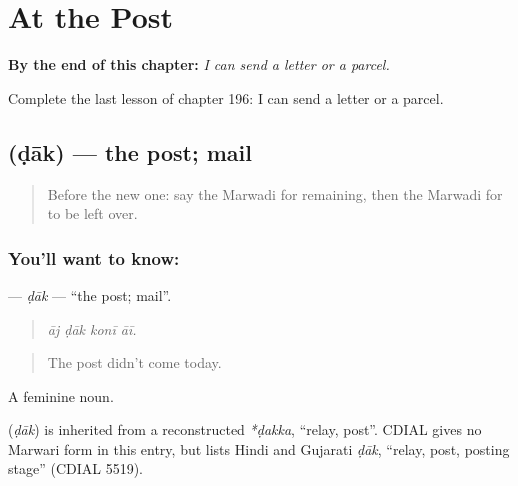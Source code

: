
\chapter{At the Post}
\label{ch:mw-at-the-post}

\begin{chapteropening}
\textbf{By the end of this chapter:} \emph{I can send a letter or a parcel.}

Complete the last lesson of chapter 196: I can send a letter or a parcel.
\end{chapteropening}

\section[\texorpdfstring{\mw{डाक} (ḍāk)}{डाक (ḍāk)}]{ (ḍāk) — the post; mail}

\label{lesson:MW-C196-dak}



\begin{quote}
Before the new one: say the Marwadi for remaining, then the Marwadi for to be left over.
\end{quote}

\subsection*{You'll want to know: }
\textbf{} — \emph{ḍāk} — \textquotedblleft{}the post; mail\textquotedblright{}.

\begin{quote}
   
\end{quote}

\begin{quote}
\emph{āj ḍāk konī āī.}
\end{quote}

\begin{quote}
The post didn't come today.
\end{quote}

A feminine noun.

\begin{cousinweb}
\textbf{} (\emph{ḍāk}) is inherited from a reconstructed \emph{*ḍakka}, \textquotedblleft{}relay, post\textquotedblright{}. CDIAL gives no Marwari form in this entry, but lists Hindi and Gujarati \emph{ḍāk}, \textquotedblleft{}relay, post, posting stage\textquotedblright{} (CDIAL 5519).
\end{cousinweb}

